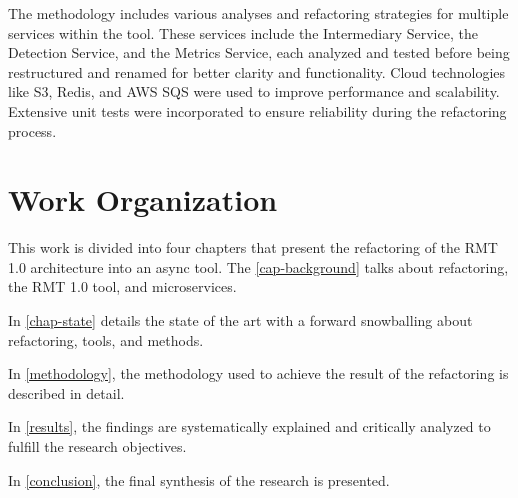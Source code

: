 The methodology includes various analyses and refactoring strategies for multiple services within the tool. These services include the Intermediary Service, the Detection Service, and the Metrics Service, each analyzed and tested before being restructured and renamed for better clarity and functionality. Cloud technologies like S3, Redis, and AWS SQS were used to improve performance and scalability. Extensive unit tests were incorporated to ensure reliability during the refactoring process.

\section{Work Organization}

This work is divided into four chapters that present the refactoring of the RMT 1.0 architecture into an async tool. The \cref{cap-background} talks about refactoring, the RMT 1.0 tool, and microservices.

In \cref{chap-state} details the state of the art with a forward snowballing about refactoring, tools, and methods.

In \cref{methodology}, the methodology used to achieve the result of the refactoring is described in detail.

In \cref{results}, the findings are systematically explained and critically analyzed to fulfill the research objectives.

In \cref{conclusion}, the final synthesis of the research is presented.